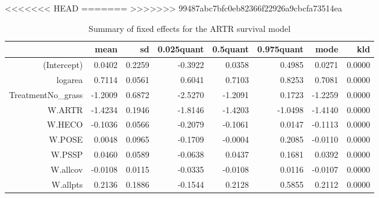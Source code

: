 <<<<<<< HEAD
=======
>>>>>>> 99487abc7bfc0eb82366f22926a9cbcfa73514ea
\begin{table}[ht]
\centering
\caption{Summary of fixed effects for the ARTR survival model} 
\label{ARTRsurvival}
\begin{tabular}{rrrrrrrr}
  \hline
 & mean & sd & 0.025quant & 0.5quant & 0.975quant & mode & kld \\ 
  \hline
(Intercept) & 0.0402 & 0.2259 & -0.3922 & 0.0358 & 0.4985 & 0.0271 & 0.0000 \\ 
  logarea & 0.7114 & 0.0561 & 0.6041 & 0.7103 & 0.8253 & 0.7081 & 0.0000 \\ 
  TreatmentNo\_grass & -1.2009 & 0.6872 & -2.5270 & -1.2091 & 0.1723 & -1.2259 & 0.0000 \\ 
  W.ARTR & -1.4234 & 0.1946 & -1.8146 & -1.4203 & -1.0498 & -1.4140 & 0.0000 \\ 
  W.HECO & -0.1036 & 0.0566 & -0.2079 & -0.1061 & 0.0147 & -0.1113 & 0.0000 \\ 
  W.POSE & 0.0048 & 0.0965 & -0.1709 & -0.0004 & 0.2085 & -0.0110 & 0.0000 \\ 
  W.PSSP & 0.0460 & 0.0589 & -0.0638 & 0.0437 & 0.1681 & 0.0392 & 0.0000 \\ 
  W.allcov & -0.0108 & 0.0115 & -0.0335 & -0.0108 & 0.0116 & -0.0107 & 0.0000 \\ 
  W.allpts & 0.2136 & 0.1886 & -0.1544 & 0.2128 & 0.5855 & 0.2112 & 0.0000 \\ 
   \hline
\end{tabular}
\end{table}

